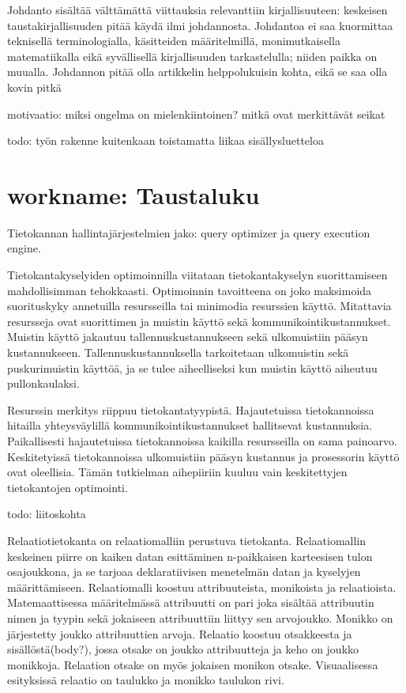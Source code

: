 \documentclass[finnish]{tktltiki2}
\theoremstyle{definition}
\theoremstyle{remark}
\begin{document}
Johdanto sisältää välttämättä viittauksia relevanttiin kirjallisuuteen:
keskeisen taustakirjallisuuden pitää käydä ilmi johdannosta.
Johdantoa ei saa kuormittaa teknisellä terminologialla, käsitteiden määritelmillä, monimutkaisella matematiikalla eikä syvällisellä kirjallisuuden
tarkastelulla; niiden paikka on muualla.
Johdannon pitää olla artikkelin helppolukuisin kohta, eikä se saa olla
kovin pitkä

motivaatio: miksi ongelma on mielenkiintoinen? mitkä ovat merkittävät seikat

todo: työn rakenne kuitenkaan toistamatta liikaa sisällysluetteloa

\section{workname: Taustaluku}
Tietokannan hallintajärjestelmien jako: query optimizer ja query execution engine.

Tietokantakyselyiden optimoinnilla viitataan tietokantakyselyn suorittamiseen mahdollisimman tehokkaasti. Optimoinnin tavoitteena on joko maksimoida suorituskyky annetuilla resursseilla tai minimodia resurssien käyttö. Mitattavia resursseja ovat suorittimen ja muistin käyttö sekä kommunikointikustannukset. Muistin käyttö jakautuu tallennuskustannukseen sekä ulkomuistiin pääsyn kustannukseen. Tallennuskustannuksella tarkoitetaan ulkomuistin sekä puskurimuistin käyttöä, ja se tulee aiheelliseksi kun muistin käyttö aiheutuu pullonkaulaksi. 

Resurssin merkitys riippuu tietokantatyypistä. Hajautetuissa tietokannoissa hitailla yhteysväylillä kommunikointikustannukset hallitsevat kustannuksia. Paikallisesti hajautetuissa tietokannoissa kaikilla resursseilla on sama painoarvo. Keskitetyissä tietokannoissa ulkomuistiin pääsyn kustannus ja prosessorin käyttö ovat oleellisia. Tämän tutkielman aihepiiriin kuuluu vain keskitettyjen tietokantojen optimointi.

todo: liitoskohta

Relaatiotietokanta on relaatiomalliin perustuva tietokanta. Relaatiomallin keskeinen piirre on kaiken datan esittäminen n-paikkaisen karteesisen tulon osajoukkona, ja se tarjoaa deklaratiivisen menetelmän datan ja kyselyjen määrittämiseen. Relaatiomalli koostuu attribuuteista, monikoista ja relaatioista. Matemaattisessa määritelmässä attribuutti on pari joka sisältää attribuutin nimen ja tyypin sekä jokaiseen attribuuttiin liittyy sen arvojoukko. Monikko on järjestetty joukko attribuuttien arvoja. Relaatio koostuu otsakkeesta ja sisällöstä(body?), jossa otsake on joukko attribuutteja ja keho on joukko monikkoja. Relaation otsake on myös jokaisen monikon otsake. Visuaalisessa esityksissä relaatio on taulukko ja monikko taulukon rivi. 
\end{document}
